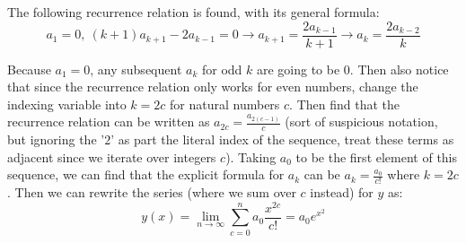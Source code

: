 \documentclass[11pt]{article}
\begin{document}
The following recurrence relation is found, with its general formula:
$$a_1 = 0,~ (k+1)a_{k+1}-2a_{k-1} = 0 \to a_{k+1} = \frac{2a_{k-1}}{k+1} \to a_{k} = \frac{2a_{k-2}}{k}$$

Because $a_1 = 0$, any subsequent $a_k$ for odd $k$ are going to be $0$. Then also notice that since the recurrence relation only works for even numbers, change the indexing variable into $k = 2c$ for natural numbers $c$. Then find that the recurrence relation can be written as $a_{2c} = \frac{a_{2(c-1)}}{c}$ (sort of suspicious notation, but ignoring the '$2$' as part the literal index of the sequence, treat these terms as adjacent since we iterate over integers $c$). Taking $a_0$ to be the first element of this sequence, we can find that the explicit formula for $a_k$ can be $a_k = \frac{a_0}{c!}$ where $k=2c$. Then we can rewrite the series (where we sum over $c$ instead) for $y$ as:
$$y(x) = \lim_{n\to \infty}\sum_{c=0}^n a_0 \frac{x^{2c}}{c!} = a_0e^{x^2}$$
\end{document}
